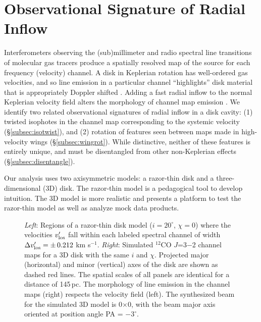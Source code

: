 \section{Observational Signature of Radial Inflow} \label{sec:twist}

Interferometers observing the (sub)millimeter and radio spectral line 
transitions of molecular gas tracers produce a spatially resolved map of the 
source for each frequency (velocity) channel.  A disk in Keplerian rotation has 
well-ordered gas velocities, and so line emission in a particular channel
``highlights'' disk material that is appropriately Doppler shifted 
\citep[e.g.,][]{omodaka92,beckwith93}.  Adding a fast radial inflow to the 
normal Keplerian velocity field alters the morphology of channel map emission
\citep[cf.][]{tang12}.  We identify two related observational signatures of 
radial inflow in a disk cavity: (1) twisted isophotes in the channel map
corresponding to the systemic velocity (\S \ref{subsec:isotwist}), and (2) 
rotation of features seen between maps made in high-velocity wings (\S\ref{subsec:wingrot}).
While distinctive, neither of these features is entirely unique, and must be 
disentangled from other non-Keplerian effects (\S \ref{subsec:disentangle}).

Our analysis uses two axisymmetric models: a razor-thin disk and a 
three-dimensional (3D) disk.  The razor-thin model is a pedagogical tool to 
develop intuition.  The 3D model is more realistic and presents a platform to 
test the razor-thin model as well as analyze mock data products.

\begin{figure}[t!]
\caption{
{\it Left}: Regions of a razor-thin disk model ($i=20^\circ$, $\chi=0$) where 
the velocities $v'_{\rm los}$ fall within each labeled spectral channel of 
width $\Delta v'_{\rm los} = \pm \,0.212$ km s$^{-1}$.  {\it Right}: Simulated 
$^{12}$CO $J$=3$-$2 channel maps for a 3D disk with the same $i$ and $\chi$.  
Projected major (horizontal) and minor (vertical) axes of the disk are shown as 
dashed red lines.  The spatial scales of all panels are identical for a 
distance of 145\,pc.  The morphology of line emission in the channel maps 
(right) respects the velocity field (left).  The synthesized beam for the 
simulated 3D model is 0$\times$0, with the 
beam major axis oriented at position angle PA = $-3^\circ$. \label{fig:models}}
\end{figure}

